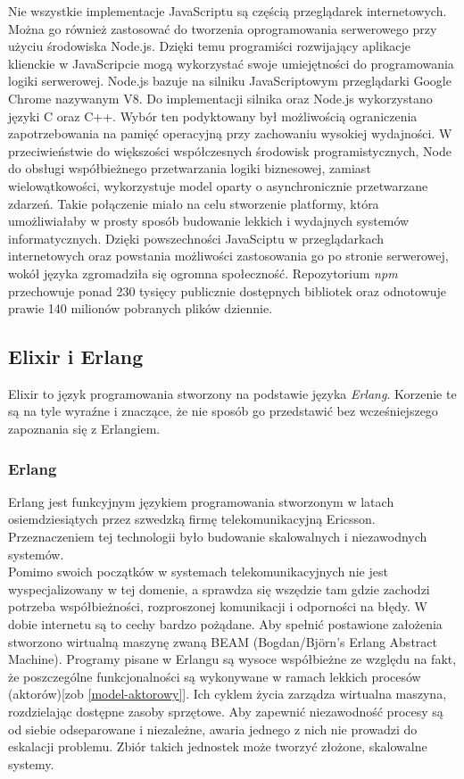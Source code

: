 \documentclass[12pt,twoside]{article}
\begin{document}
Nie wszystkie implementacje JavaScriptu są częścią przeglądarek
internetowych. Można go również zastosować do tworzenia oprogramowania
serwerowego przy użyciu środowiska Node.js. Dzięki temu programiści
rozwijający aplikacje klienckie w JavaScripcie mogą wykorzystać swoje
umiejętności do programowania logiki serwerowej. Node.js bazuje na
silniku JavaScriptowym przeglądarki Google Chrome nazywanym V8. Do
implementacji silnika oraz Node.js wykorzystano języki C oraz C++. Wybór
ten podyktowany był możliwością ograniczenia zapotrzebowania na pamięć
operacyjną przy zachowaniu wysokiej wydajności. W przeciwieństwie do
większości współczesnych środowisk programistycznych, Node do obsługi
współbieżnego przetwarzania logiki biznesowej, zamiast wielowątkowości,
wykorzystuje model oparty o asynchronicznie przetwarzane zdarzeń. Takie
połączenie miało na celu stworzenie platformy, która umożliwiałaby w
prosty sposób budowanie lekkich i wydajnych systemów informatycznych.
Dzięki powszechności JavaSciptu w przeglądarkach internetowych oraz
powstania możliwości zastosowania go po stronie serwerowej, wokół języka
zgromadziła się ogromna społeczność. Repozytorium \emph{npm} przechowuje
ponad 230 tysięcy publicznie dostępnych bibliotek oraz odnotowuje prawie
140 milionów pobranych plików
dziennie.\autocite{npm2015,tilkov2010node,lerner2011node}

\subsection{Elixir i Erlang}\label{elixir-i-erlang}

Elixir to język programowania stworzony na podstawie języka
\emph{Erlang}. Korzenie te są na tyle wyraźne i znaczące, że nie sposób
go przedstawić bez wcześniejszego zapoznania się z Erlangiem.

\subsubsection{Erlang}\label{erlang}

Erlang jest funkcyjnym językiem programowania stworzonym w latach
osiemdziesiątych przez szwedzką firmę telekomunikacyjną Ericsson.
Przeznaczeniem tej technologii było budowanie skalowalnych i
niezawodnych systemów.\\
Pomimo swoich początków w systemach telekomunikacyjnych nie jest
wyspecjalizowany w tej domenie, a sprawdza się wszędzie tam gdzie
zachodzi potrzeba współbieżności, rozproszonej komunikacji i odporności
na błędy.\autocite{armstrong96erlang} W dobie internetu są to cechy
bardzo pożądane. Aby spełnić postawione założenia stworzono wirtualną
maszynę zwaną BEAM (Bogdan/Björn's Erlang Abstract
Machine)\autocite{hebert2013erlang}. Programy pisane w Erlangu są wysoce
współbieżne ze względu na fakt, że poszczególne funkcjonalności są
wykonywane w ramach lekkich procesów (aktorów){[}zob
\ref{model-aktorowy}{]}. Ich cyklem życia zarządza wirtualna maszyna,
rozdzielając dostępne zasoby sprzętowe. Aby zapewnić niezawodność
procesy są od siebie odseparowane i niezależne, awaria jednego z nich
nie prowadzi do eskalacji problemu. Zbiór takich jednostek może tworzyć
złożone, skalowalne systemy.\autocite{logan2010erlang}
\end{document}
